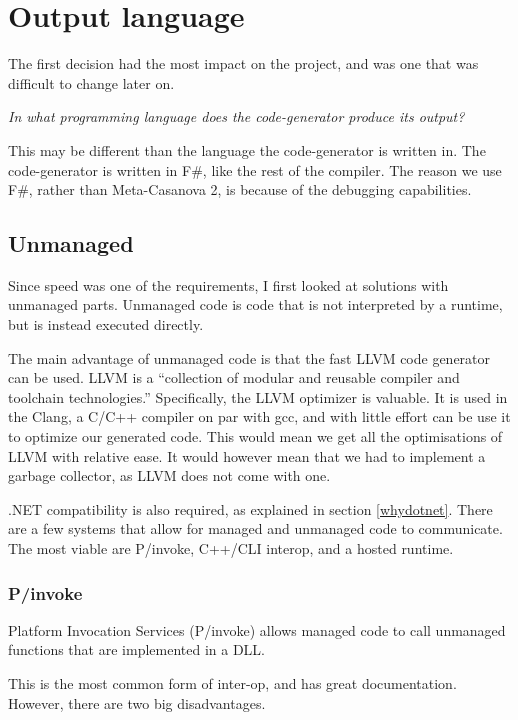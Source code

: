 \section{Output language}
The first decision had the most impact on the project, and was one that was difficult to change later on.

\textit{In what programming language does the code-generator produce its output?}

This may be different than the language the code-generator is written in.
The code-generator is written in F\#, like the rest of the compiler.
The reason we use F\#, rather than Meta-Casanova 2, is because of the debugging capabilities.

\subsection{Unmanaged}
Since speed was one of the requirements, I first looked at solutions with unmanaged parts.
Unmanaged code is code that is not interpreted by a runtime, but is instead executed directly.

The main advantage of unmanaged code is that the fast LLVM code generator can be used.
LLVM is a ``collection of modular and reusable compiler and toolchain technologies.''\cite{llvm}
Specifically, the LLVM optimizer is valuable.
It is used in the Clang, a C/C++ compiler on par with gcc, and with little effort can be use it to optimize our generated code.
This would mean we get all the optimisations of LLVM with relative ease.
It would however mean that we had to implement a garbage collector, as LLVM does not come with one.
 
.NET compatibility is also required, as explained in section \ref{whydotnet}.
There are a few systems that allow for managed and unmanaged code to communicate.
The most viable are P/invoke, C++/CLI interop, and a hosted runtime.

\subsubsection*{P/invoke}
Platform Invocation Services (P/invoke) allows managed code to call unmanaged functions that are implemented in a DLL.\cite{msdn_pinvoke}

This is the most common form of inter-op, and has great documentation.
However, there are two big disadvantages.

